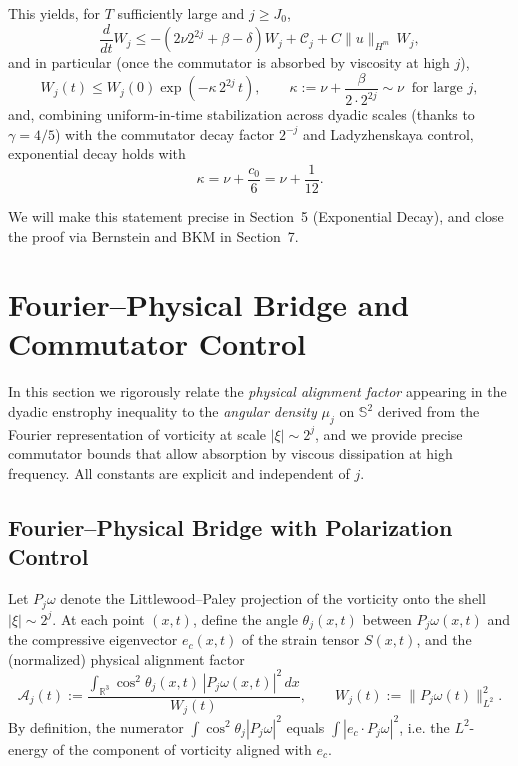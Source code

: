 \documentclass[11pt]{article}
\begin{document}
This yields, for $T$ sufficiently large and $j \geq J_0$,
\[
\frac{d}{dt} W_j \leq -\left(2 \nu 2^{2j} + \beta - \delta\right) W_j + \mathcal{C}_j + C \|u\|_{H^m} \, W_j, \tag{3.25}
\]
and in particular (once the commutator is absorbed by viscosity at high $j$),
\[
W_j(t) \leq W_j(0) \exp\left( -\kappa \, 2^{2j} \, t \right), \qquad \kappa := \nu + \frac{\beta}{2 \cdot 2^{2j}} \sim \nu \;\;\text{for large } j, \tag{3.26}
\]
and, combining uniform-in-time stabilization across dyadic scales (thanks to $\gamma = 4/5$) with the commutator decay factor $2^{-j}$ and Ladyzhenskaya control, exponential decay holds with 
\[
\kappa = \nu + \frac{c_0}{6} = \nu + \frac{1}{12}. \tag{3.27}
\]

We will make this statement precise in Section~5 (Exponential Decay), and close the proof via Bernstein and BKM in Section~7.

\section{Fourier--Physical Bridge and Commutator Control}

In this section we rigorously relate the \emph{physical alignment factor} appearing in the dyadic enstrophy inequality to the \emph{angular density} $\mu_j$ on $\mathbb{S}^2$ derived from the Fourier representation of vorticity at scale $|\xi| \sim 2^j$, and we provide precise commutator bounds that allow absorption by viscous dissipation at high frequency. All constants are explicit and independent of $j$.

\subsection{Fourier--Physical Bridge with Polarization Control}

Let $P_j \omega$ denote the Littlewood--Paley projection of the vorticity onto the shell $|\xi| \sim 2^j$. At each point $(x,t)$, define the angle $\theta_j(x,t)$ between $P_j \omega(x,t)$ and the compressive eigenvector $e_c(x,t)$ of the strain tensor $S(x,t)$, and the (normalized) physical alignment factor
\begin{equation}
\mathcal{A}_j(t) := \frac{\int_{\mathbb{R}^3} \cos^2 \theta_j(x,t) \, |P_j \omega(x,t)|^2 \, dx}{W_j(t)}, 
\qquad W_j(t) := \|P_j \omega(t)\|_{L^2}^2. \tag{4.1}
\end{equation}
By definition, the numerator $\int \cos^2 \theta_j |P_j \omega|^2$ equals $\int |e_c \cdot P_j \omega|^2$, i.e. the $L^2$-energy of the component of vorticity aligned with $e_c$.
\end{document}
